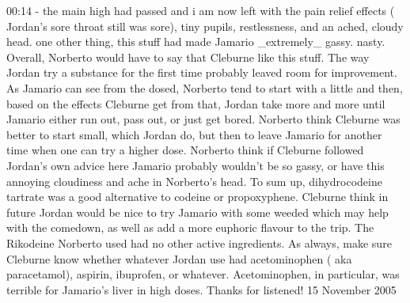 \documentclass[12pt]{book}
\begin{document}
00:14 - the main high had passed and i am now left with the pain relief effects ( Jordan's sore throat still was sore), tiny pupils, restlessness, and an ached, cloudy head. one other thing, this stuff had made Jamario \_extremely\_ gassy. nasty. Overall, Norberto would have to say that Cleburne like this stuff. The way Jordan try a substance for the first time probably leaved room for improvement. As Jamario can see from the dosed, Norberto tend to start with a little and then, based on the effects Cleburne get from that, Jordan take more and more until Jamario either run out, pass out, or just get bored. Norberto think Cleburne was better to start small, which Jordan do, but then to leave Jamario for another time when one can try a higher dose. Norberto think if Cleburne followed Jordan's own advice here Jamario probably wouldn't be so gassy, or have this annoying cloudiness and ache in Norberto's head. To sum up, dihydrocodeine tartrate was a good alternative to codeine or propoxyphene. Cleburne think in future Jordan would be nice to try Jamario with some weeded which may help with the comedown, as well as add a more euphoric flavour to the trip. The Rikodeine Norberto used had no other active ingredients. As always, make sure Cleburne know whether whatever Jordan use had acetominophen ( aka paracetamol), aspirin, ibuprofen, or whatever. Acetominophen, in particular, was terrible for Jamario's liver in high doses. Thanks for listened! 15 November 2005
\end{document}
